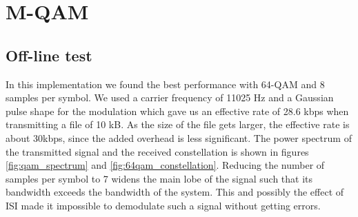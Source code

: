 \documentclass[12pt,a4paper,openright]{report}
\begin{document}
\section{M-QAM}

\subsection{Off-line test}
In this implementation we found the best performance with 64-QAM and 8 samples per symbol. We used a carrier frequency of 11025 Hz and a Gaussian pulse shape for the modulation which gave us an effective rate of 28.6 kbps when transmitting a file of 10 kB. As the size of the file gets larger, the effective rate is about 30kbps, since the added overhead is less significant. The power spectrum of the transmitted signal and the received constellation is shown in figures \ref{fig:qam_spectrum} and \ref{fig:64qam_constellation}. Reducing the number of samples per symbol to 7 widens the main lobe of the signal such that its bandwidth exceeds the bandwidth of the system. This and possibly the effect of ISI made it impossible to demodulate such a signal without getting errors.
\end{document}
